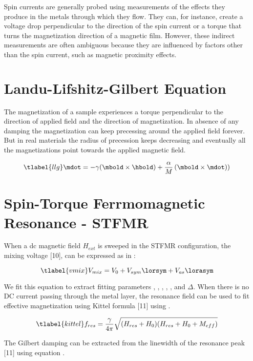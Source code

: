 Spin currents are generally probed using measurements of the effects they produce in the metals through which they flow. They can, for instance, create a voltage drop perpendicular to the direction of the spin current or a torque that turns the magnetization direction of a magnetic film. However, these indirect measurements are often ambiguous because they are influenced by factors other than the spin current, such as magnetic proximity effects.


\section{Landu-Lifshitz-Gilbert Equation}
The magnetization of a sample experiences a torque perpendicular to the direction of 
applied field and the direction of magnetization. In absence of any damping the magnetization 
can keep precessing around the applied field forever. But in real materials the radius of 
precession keeps decreasing and eventually all the magnetizations point towards the applied 
magnetic field.  

\begin{equation}
    \tlabel{llg}
    \mdot = -\gamma(\mbold \times \hbold)+ \frac{\alpha}{M} \left(\mbold \times \mdot)\right)
\end{equation}

\section{Spin-Torque Ferrmomagnetic Resonance - STFMR}
When a dc magnetic field $H_{ext}$ is sweeped in the STFMR configuration, the mixing 
voltage [10], can be expressed as in :

\begin{equation}
    \tlabel{vmix}
    V_{mix} = V_{0} + V_{sym} \lorsym + V_{as} \lorasym
\end{equation}

We fit this equation to extract fitting parameters \vo, \hres, \vsym, \vas, \hres, and $\Delta$. 
When there is no DC current passing through the metal layer, the resonance field can be used to 
fit effective magnetization using Kittel formula [11] using .

\begin{equation}
    \tlabel{kittel}
    f_{res} = \frac{\gamma}{4\pi} \sqrt{(H_{res} + H_{0})(H_{res} + H_{0} + M_{eff})}
\end{equation}

The Gilbert damping can be extracted from the linewidth of the resonance peak [11] using equation .

